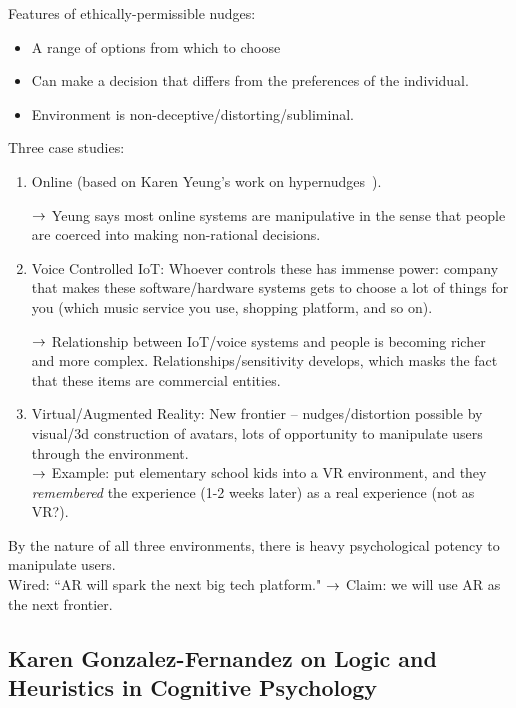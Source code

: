 Features of ethically-permissible nudges:
\begin{itemize}
    \item A range of options from which to choose
    \item Can make a decision that differs from the preferences of the individual.
    \item Environment is non-deceptive/distorting/subliminal.
\end{itemize}

Three case studies:
\begin{enumerate}
    \item Online (based on Karen Yeung's work on hypernudges~\cite{yeung2017hypernudge}).
    
    $\rightarrow$ Yeung says most online systems are manipulative in the sense that people are coerced into making non-rational decisions.
    
    \item Voice Controlled IoT: Whoever controls these has immense power: company that makes these software/hardware systems gets to choose a lot of things for you (which music service you use, shopping platform, and so on).
    
    $\rightarrow$ Relationship between IoT/voice systems and people is becoming richer and more complex. Relationships/sensitivity develops, which masks the fact that these items are commercial entities.
    
    \item Virtual/Augmented Reality: New frontier -- nudges/distortion possible by visual/3d construction of avatars, lots of opportunity to manipulate users through the environment. \\
    
    $\rightarrow$ Example: put elementary school kids into a VR environment, and they {\it remembered} the experience (1-2 weeks later) as a real experience (not as VR?).
    
\end{enumerate}

By the nature of all three environments, there is heavy psychological potency to manipulate users. \\

Wired: ``AR will spark the next big tech platform." $\rightarrow$ Claim: we will use AR as the next frontier.

\spacerule

\subsection{Karen Gonzalez-Fernandez on Logic
and Heuristics in Cognitive Psychology}

